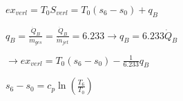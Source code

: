\( ex_{verl} = T_0 S_{verl} = T_0 (s_6 - s_0) + q_B \)  

\( q_B = \frac{\dot{Q}_B}{\dot{m}_{ges}} = \frac{\dot{Q}_B}{\dot{m}_{jet}} = 6.233 \rightarrow q_B = 6.233 \dot{Q}_B \)  

\( \rightarrow ex_{verl} = T_0 (s_6 - s_0) - \frac{1}{6.233} q_B \)  

\( s_6 - s_0 = c_p \ln \left( \frac{T_6}{T_0} \right) \)